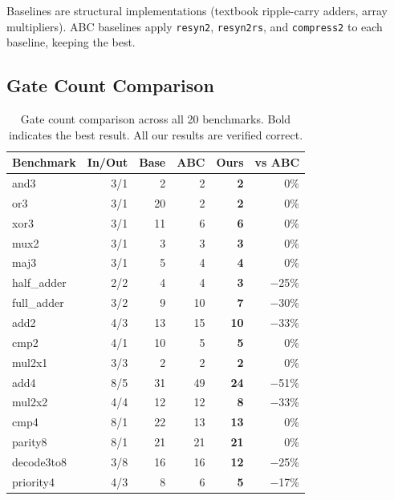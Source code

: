 \documentclass[conference,10pt]{IEEEtran}
\begin{document}
Baselines are structural implementations (textbook ripple-carry adders, array multipliers). ABC baselines apply \texttt{resyn2}, \texttt{resyn2rs}, and \texttt{compress2} to each baseline, keeping the best.

\subsection{Gate Count Comparison}

\begin{table}[t]
\centering
\caption{Gate count comparison across all 20 benchmarks. Bold indicates the best result. All our results are verified correct.}
\label{tab:results}
\footnotesize
\begin{tabular}{@{}lrrrrr@{}}
\toprule
\textbf{Benchmark} & \textbf{In/Out} & \textbf{Base} & \textbf{ABC} & \textbf{Ours} & \textbf{vs ABC} \\
\midrule
and3        & 3/1  &   2 &   2 & \textbf{2}  & 0\% \\
or3         & 3/1  &  20 &   2 & \textbf{2}  & 0\% \\
xor3        & 3/1  &  11 &   6 & \textbf{6}  & 0\% \\
mux2        & 3/1  &   3 &   3 & \textbf{3}  & 0\% \\
maj3        & 3/1  &   5 &   4 & \textbf{4}  & 0\% \\
half\_adder & 2/2  &   4 &   4 & \textbf{3}  & \textcolor{wingreen}{$-$25\%} \\
full\_adder & 3/2  &   9 &  10 & \textbf{7}  & \textcolor{wingreen}{$-$30\%} \\
add2        & 4/3  &  13 &  15 & \textbf{10} & \textcolor{wingreen}{$-$33\%} \\
cmp2        & 4/1  &  10 &   5 & \textbf{5}  & 0\% \\
mul2x1      & 3/3  &   2 &   2 & \textbf{2}  & 0\% \\
add4        & 8/5  &  31 &  49 & \textbf{24} & \textcolor{wingreen}{$-$51\%} \\
mul2x2      & 4/4  &  12 &  12 & \textbf{8}  & \textcolor{wingreen}{$-$33\%} \\
cmp4        & 8/1  &  22 &  13 & \textbf{13} & 0\% \\
parity8     & 8/1  &  21 &  21 & \textbf{21} & 0\% \\
decode3to8  & 3/8  &  16 &  16 & \textbf{12} & \textcolor{wingreen}{$-$25\%} \\
priority4   & 4/3  &   8 &   6 & \textbf{5}  & \textcolor{wingreen}{$-$17\%} \\

\end{tabular}
\end{table}
\end{document}
